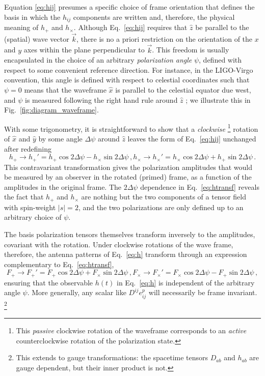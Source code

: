 \documentclass[aps,prd,twocolumn,superscriptaddress,preprintnumbers,floatfix,nofootinbib]{revtex4-2}
\newcommand{\beq}{\begin{equation}}
\newcommand{\eeq}{\end{equation}}
\newcommand*{\eq}[1]{Eq.~\eqref{eq:#1}}
\begin{document}
Equation \eqref{eq:hij} presumes a specific choice of frame orientation that defines the basis in which the $h_{ij}$ components are written and, therefore, the physical meaning of $h_{+}$ and $h_\times$.
Although \eq{hij} requires that $\hat{z}$ be parallel to the (spatial) wave vector $\vec{k}$, there is no a priori restriction on the orientation of the $x$ and $y$ axes within the plane perpendicular to $\vec{k}$.
This freedom is usually encapsulated in the choice of an arbitrary \emph{polarization angle} $\psi$, defined with respect to some convenient reference direction.
For instance, in the LIGO-Virgo convention, this angle is defined with respect to celestial coordinates such that $\psi=0$ means that the waveframe $\hat{x}$ is parallel to the celestial equator due west, and $\psi$ is measured following the right hand rule around $\hat{z}$ \cite{LALSuite:wave}; we illustrate this in Fig.~\ref{fig:diagram_waveframe}.

With some trigonometry, it is straightforward to show that a \emph{clockwise}%
\footnote{This \emph{passive} clockwise rotation of the waveframe corresponds to an \emph{active} counterclockwise rotation of the polarization state.}
rotation of $\hat{x}$ and $\hat{y}$ by some angle $\Delta \psi$ around $\hat{z}$ leaves the form of \eq{hij} unchanged after redefining
\begin{subequations} \label{eq:htransf}
\beq
h_+ \rightarrow h_+' = h_+ \cos 2\Delta \psi - h_\times \sin 2\Delta\psi \, ,
\eeq
\beq
h_\times \rightarrow h_\times' = h_\times \cos 2\Delta \psi + h_+ \sin 2\Delta\psi \, .
\eeq
\end{subequations}
This contravariant transformation gives the polarization amplitudes that would be measured by an observer in the rotated (primed) frame, as a function of the amplitudes in the original frame.
The $2\Delta\psi$ dependence in \eq{htransf} reveals the fact that $h_+$ and $h_\times$ are nothing but the two components of a tensor field with spin-weight $|s|=2$, and the two polarizations are only defined up to an arbitrary choice of $\psi$.

The basis polarization tensors themselves transform inversely to the amplitudes, covariant with the rotation.
Under clockwise rotations of the wave frame, therefore, the antenna patterns of \eq{h} transform through an expression complementary to \eq{htransf},
\begin{subequations} \label{eq:Ftransf}
\beq
F_+ \rightarrow F_+' = F_+ \cos 2\Delta \psi + F_\times \sin 2\Delta\psi \, ,
\eeq
\beq
F_\times \rightarrow F_\times' = F_\times \cos 2\Delta \psi - F_+ \sin 2\Delta\psi \, ,
\eeq
\end{subequations}
ensuring that the observable $h(t)$ in \eq{h} is independent of the arbitrary angle $\psi$.
More generally, any scalar like $D^{ij} e^{p}_{ij}$ will necessarily be frame invariant.%
\footnote{This extends to gauge transformations: the spacetime tensors $D_{ab}$ and $h_{ab}$ are gauge dependent, but their inner product is not.}
\end{document}
